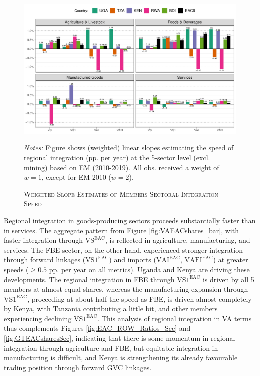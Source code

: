 \documentclass[a4paper]{article}
\begin{document}
\begin{figure}[h!] 
\centering
\caption{\label{fig:VAEACshares_bar_sec}\textsc{Weighted Slope Estimates of Members Sectoral Integration Speed}}
\includegraphics[width=1\textwidth, trim= {0 0 0 0}, clip]{"EM_VA_EAC5_shares_slope_bar_sec.pdf"} \\ \raggedright
\scriptsize
\emph{Notes:} Figure shows (weighted) linear slopes estimating the speed of regional integration (pp. per year) at the 5-sector level (excl. mining) based on EM (2010-2019). All obs. received a weight of $w=1$, except for EM 2010 ($w=2$).  
\end{figure}
\FloatBarrier

Regional integration in goods-producing sectors proceeds substantially faster than in services. The aggregate pattern from Figure \ref{fig:VAEACshares_bar}, with faster integration through $\text{VS}^\text{EAC}$, is reflected in agriculture, manufacturing, and services. The FBE sector, on the other hand, experienced stronger integration through forward linkages ($\text{VS1}^\text{EAC}$) and imports ($\text{VAI}^\text{EAC}$, $\text{VAFI}^\text{EAC}$) at greater speeds ($\geq 0.5$ pp. per year on all metrics). Uganda and Kenya are driving these developments. The regional integration in FBE through $\text{VS1}^\text{EAC}$ is driven by all 5 members at almost equal shares, whereas the manufacturing expansion through $\text{VS1}^\text{EAC}$, proceeding at about half the speed as FBE, is driven almost completely by Kenya, with Tanzania contributing a little bit, and other members experiencing declining $\text{VS1}^\text{EAC}$. This analysis of regional integration in VA terms thus complements Figures \ref{fig:EAC_ROW_Ratios_Sec} and \ref{fig:GTEACsharesSec}, indicating that there is some momentum in regional integration through agriculture and FBE, but equitable integration in manufacturing is difficult, and Kenya is strengthening its already favourable trading position through forward GVC linkages. 
\end{document}
